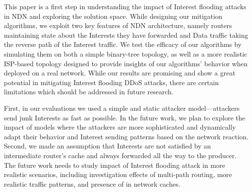 
This paper is a first step in understanding the impact of Interest flooding attacks in NDN and exploring the solution space. 
While designing our mitigation algorithms, we exploit two key features of NDN architecture, namely routers maintaining state about the Interests they have forwarded and Data traffic taking the reverse path of the Interest traffic. 
We test the efficacy of our algorithms by simulating them on both a simple binary-tree topology, %
as well as a more realistic ISP-based topology designed to provide insights of our algorithms' behavior when deployed on a real network. 
While our results are promising and show a great potential in mitigating Interest flooding DDoS attacks, there are certain limitations which should be addressed in future research. 

First, in our evaluations we used a simple and static attacker model---attackers send junk Interests as fast as possible. 
In the future work, we plan to explore the impact of models where the attackers are more sophisticated and dynamically adapt their behavior and Interest sending patterns based on the network reaction. 
Second, we made an assumption that Interests are not satisfied by an intermediate router's cache and always forwarded all the way to the producer.  
The future work needs to study impact of Interest flooding attack in more realistic scenarios, including investigation effects of multi-path routing, more realistic traffic patterns, and presence of in network caches.



